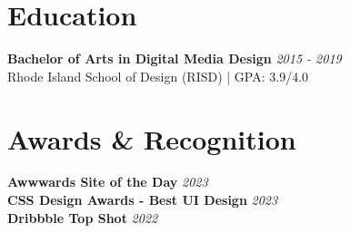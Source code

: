 \documentclass[11pt]{article}
\begin{document}
\section*{Education}

\textbf{\color{accentcolor}Bachelor of Arts in Digital Media Design} \hfill \textit{2015 - 2019} \\
Rhode Island School of Design (RISD) | GPA: 3.9/4.0

\vspace{0.2cm}

\section*{Awards \& Recognition}

\textbf{\color{accentcolor}Awwwards Site of the Day} \hfill \textit{2023} \\
\textbf{\color{accentcolor}CSS Design Awards - Best UI Design} \hfill \textit{2023} \\
\textbf{\color{accentcolor}Dribbble Top Shot} \hfill \textit{2022}
\end{document}
